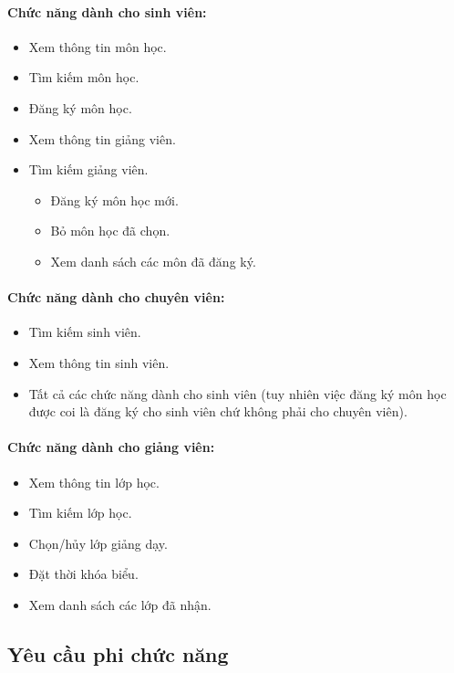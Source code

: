 \documentclass{article}
\begin{document}
    \paragraph{Chức năng dành cho sinh viên:}
    \begin{itemize}
      \item Xem thông tin môn học.
      \item Tìm kiếm môn học.
      \item Đăng ký môn học.
      \item Xem thông tin giảng viên.
      \item Tìm kiếm giảng viên.
      \begin{itemize}
        \item Đăng ký môn học mới.
        \item Bỏ môn học đã chọn.
        \item Xem danh sách các môn đã đăng ký.
      \end{itemize}
    \end{itemize}

    \paragraph{Chức năng dành cho chuyên viên:}
    \begin{itemize}
      \item Tìm kiếm sinh viên.
      \item Xem thông tin sinh viên.
      \item Tất cả các chức năng dành cho sinh viên (tuy nhiên việc đăng ký môn học được coi là đăng ký cho sinh viên chứ không phải cho chuyên viên).
    \end{itemize}

    \paragraph{Chức năng dành cho giảng viên:}
    \begin{itemize}
      \item Xem thông tin lớp học.
      \item Tìm kiếm lớp học.
      \item Chọn/hủy lớp giảng dạy.
      \item Đặt thời khóa biểu.
      \item Xem danh sách các lớp đã nhận.
    \end{itemize}

  \subsection{Yêu cầu phi chức năng}
\end{document}
